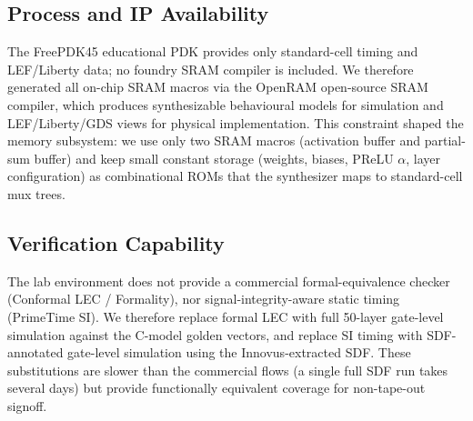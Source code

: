 \subsection{Process and IP Availability}
The FreePDK45 educational PDK provides only standard-cell timing and LEF/Liberty data; no foundry SRAM compiler is included. We therefore generated all on-chip SRAM macros via the OpenRAM open-source SRAM compiler, which produces synthesizable behavioural models for simulation and LEF/Liberty/GDS views for physical implementation. This constraint shaped the memory subsystem: we use only two SRAM macros (activation buffer and partial-sum buffer) and keep small constant storage (weights, biases, PReLU $\alpha$, layer configuration) as combinational ROMs that the synthesizer maps to standard-cell mux trees.

\subsection{Verification Capability}
The lab environment does not provide a commercial formal-equivalence checker (Conformal LEC / Formality), nor signal-integrity-aware static timing (PrimeTime SI). We therefore replace formal LEC with full 50-layer gate-level simulation against the C-model golden vectors, and replace SI timing with SDF-annotated gate-level simulation using the Innovus-extracted SDF. These substitutions are slower than the commercial flows (a single full SDF run takes several days) but provide functionally equivalent coverage for non-tape-out signoff.
